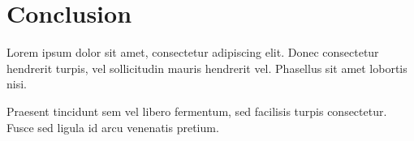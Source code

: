 \section{Conclusion}
Lorem ipsum dolor sit amet, consectetur adipiscing elit. Donec consectetur
hendrerit turpis, vel sollicitudin mauris hendrerit vel. Phasellus sit amet
lobortis nisi.

Praesent tincidunt sem vel libero fermentum, sed facilisis turpis consectetur.
Fusce sed ligula id arcu venenatis pretium.

